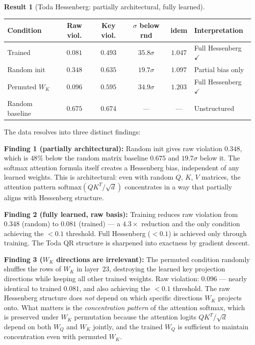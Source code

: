 \documentclass[11pt]{amsart}
\theoremstyle{definition}
\newtheorem{result}[theorem]{Result}
\begin{document}
\begin{result}[Toda Hessenberg: partially architectural, fully learned]
\label{result:arch-learned}

\begin{center}
\renewcommand{\arraystretch}{1.2}
\small
\begin{tabular}{@{}lccccl@{}}
\toprule
Condition & Raw viol. & Key viol. & $\sigma$ below rnd & idem & Interpretation \\
\midrule
Trained & $\mathbf{0.081}$ & $0.493$ & $35.8\sigma$ & $1.047$ & Full Hessenberg $\checkmark$ \\
Random init & $0.348$ & $0.635$ & $19.7\sigma$ & $1.097$ & Partial bias only \\
Permuted $W_K$ & $\mathbf{0.096}$ & $0.595$ & $34.9\sigma$ & $1.203$ & Full Hessenberg $\checkmark$ \\
\midrule
Random baseline & $0.675$ & $0.674$ & --- & --- & Unstructured \\
\bottomrule
\end{tabular}
\end{center}

\noindent The data resolves into three distinct findings:

\noindent\textbf{Finding 1 (partially architectural):}
Random init gives raw violation $0.348$, which is $48\%$ below the
random matrix baseline $0.675$ and $19.7\sigma$ below it.
The softmax attention formula itself creates a Hessenberg bias,
independent of any learned weights.
This is architectural: even with random $Q$, $K$, $V$ matrices,
the attention pattern $\mathrm{softmax}(QK^T/\sqrt{d})$ concentrates
in a way that partially aligns with Hessenberg structure.

\noindent\textbf{Finding 2 (fully learned, raw basis):}
Training reduces raw violation from $0.348$ (random) to $0.081$ (trained)
--- a $4.3\times$ reduction and the only condition achieving the
$< 0.1$ threshold.
Full Hessenberg ($< 0.1$) is achieved only through training.
The Toda QR structure is sharpened into exactness by gradient descent.

\noindent\textbf{Finding 3 ($W_K$ directions are irrelevant):}
The permuted condition randomly shuffles the rows of $W_K$ in layer~23,
destroying the learned key projection directions while keeping all
other trained weights.
Raw violation: $0.096$ --- nearly identical to trained $0.081$,
and also achieving the $< 0.1$ threshold.
The raw Hessenberg structure does \emph{not} depend on which specific
directions $W_K$ projects onto.
What matters is the \emph{concentration pattern} of the attention
softmax, which is preserved under $W_K$ permutation because the
attention logits $QK^T/\sqrt{d}$ depend on both $W_Q$ and $W_K$
jointly, and the trained $W_Q$ is sufficient to maintain concentration
even with permuted $W_K$.


\end{result}
\end{document}
